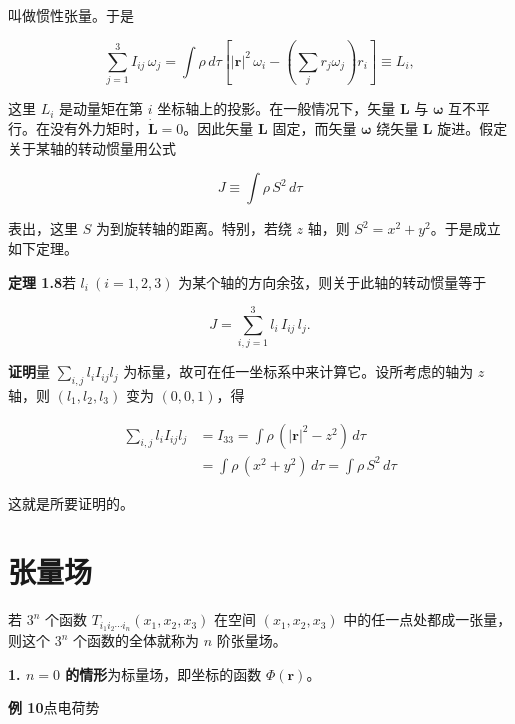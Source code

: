 \documentclass[11pt,a4paper,oneside]{ctexbook}
\newcommand{\ve}[1]{\bm{#1}}
\begin{document}
叫做惯性张量。于是

\begin{equation*}
\sum_{j=1}^{3} I_{ij}\, \omega_j = \int \rho\, d\tau \left[|\ve{r}|^{2}\, \omega_i - \left(\sum_{j} r_j \omega_j\right) r_i\right] \equiv L_i,
\end{equation*}

这里 $L_i$ 是动量矩在第 $i$ 坐标轴上的投影。在一般情况下，矢量 $\ve{L}$ 与 $\ve{\omega}$ 互不平行。在没有外力矩时，$\dot{\ve{L}} = 0$。因此矢量 $\ve{L}$ 固定，而矢量 $\ve{\omega}$ 绕矢量 $\ve{L}$ 旋进。假定关于某轴的转动惯量用公式

\begin{equation*}
J \equiv \int \rho\, S^{2}\, d\tau
\end{equation*}

表出，这里 $S$ 为到旋转轴的距离。特别，若绕 $z$ 轴，则 $S^{2} = x^{2} + y^{2}$。于是成立如下定理。

\textbf{定理 1.8}\quad 若 $l_i\ (i = 1, 2, 3)$ 为某个轴的方向余弦，则关于此轴的转动惯量等于

\begin{equation*}
J = \sum_{i,j=1}^{3} l_i\, I_{ij}\, l_j.
\end{equation*}

\textbf{证明}\quad 量 $\sum_{i,j} l_i I_{ij} l_j$ 为标量，故可在任一坐标系中来计算它。设所考虑的轴为 $z$ 轴，则 $(l_1, l_2, l_3)$ 变为 $(0, 0, 1)$，得

\begin{equation*}
\begin{aligned}
\sum_{i,j} l_i I_{ij} l_j &= I_{33} = \int \rho\, (|\ve{r}|^{2} - z^{2})\, d\tau\\
&= \int \rho\, (x^{2} + y^{2})\, d\tau = \int \rho\, S^{2}\, d\tau
\end{aligned}
\end{equation*}

这就是所要证明的。

\section{张量场}

若 $3^{n}$ 个函数 $T_{i_1 i_2 \cdots i_n}(x_1, x_2, x_3)$ 在空间 $(x_1, x_2, x_3)$ 中的任一点处都成一张量，则这个 $3^{n}$ 个函数的全体就称为 $n$ 阶张量场。

\textbf{1. $n = 0$ 的情形}\quad 为标量场，即坐标的函数 $\Phi(\ve{r})$。

\textbf{例 10}\quad 点电荷势
\end{document}
